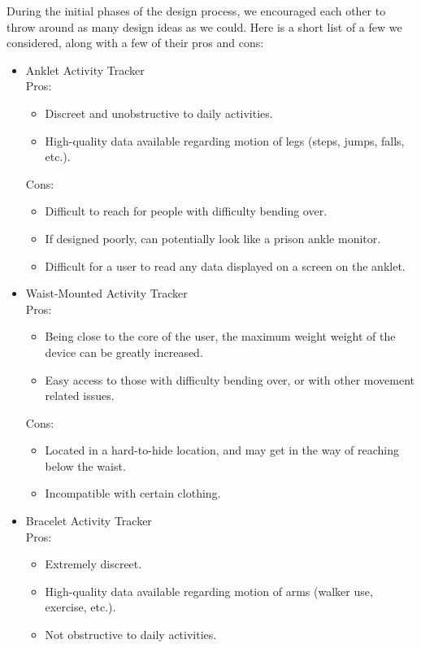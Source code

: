 \documentclass[12pt, titlepage]{article}
\begin{document}
\begin{enumerate}
During the initial phases of the design process, we encouraged each other to throw around as many design ideas as we could. Here is a short list of a few we considered, along with a few of their pros and cons:\\
\begin{itemize}
\item Anklet Activity Tracker\\
	Pros:
	\begin{itemize}
		\item Discreet and unobstructive to daily activities.
		\item High-quality data available regarding motion of legs (steps, jumps, falls, etc.).
	\end{itemize}
	Cons:
	\begin{itemize}
		\item Difficult to reach for people with difficulty bending over.
		\item If designed poorly, can potentially look like a prison ankle monitor.
		\item Difficult for a user to read any data displayed on a screen on the anklet.
	\end{itemize}
\item Waist-Mounted Activity Tracker\\
	Pros:
	\begin{itemize}
		\item Being close to the core of the user, the maximum weight weight of the device can be greatly increased.
		\item Easy access to those with difficulty bending over, or with other movement related issues.
	\end{itemize}
	Cons:
	\begin{itemize}
		\item Located in a hard-to-hide location, and may get in the way of reaching below the waist.
		\item Incompatible with certain clothing.
	\end{itemize}
\item Bracelet Activity Tracker\\
	Pros:
	\begin{itemize}
		\item Extremely discreet.
		\item High-quality data available regarding motion of arms (walker use, exercise, etc.).
		\item Not obstructive to daily activities.
	\end{itemize}

\end{itemize}
\end{enumerate}
\end{document}
